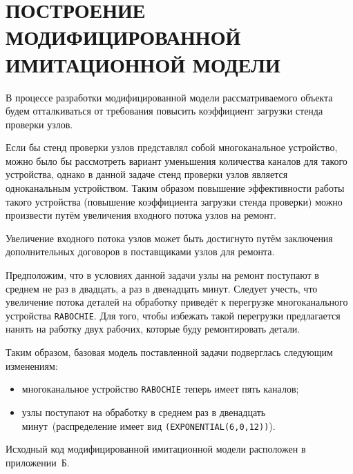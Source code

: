 \section[Построение модифицированной имитационной модели]
{ПОСТРОЕНИЕ МОДИФИЦИРОВАННОЙ \\ ИМИТАЦИОННОЙ МОДЕЛИ}

В процессе разработки модифицированной модели рассматриваемого объекта
будем отталкиваться от требования повысить коэффициент загрузки стенда
проверки узлов.

Если бы стенд проверки узлов представлял собой многоканальное
устройство, можно было бы рассмотреть вариант уменьшения количества каналов
для такого устройства, однако в данной задаче стенд проверки узлов является
одноканальным устройством. Таким образом повышение эффективности работы
такого устройства (повышение коэффициента загрузки стенда проверки) можно
произвести путём увеличения входного потока узлов на ремонт.

Увеличение входного потока узлов может быть достигнуто путём заключения
дополнительных договоров в поставщиками узлов для ремонта.

Предположим, что в условиях данной задачи узлы на ремонт поступают в среднем
не раз в двадцать, а раз в двенадцать минут. Следует учесть, что увеличение
потока деталей на обработку приведёт к перегрузке многоканального устройства
\texttt{RABOCHIE}. Для того, чтобы избежать такой перегрузки предлагается
нанять на работку двух рабочих, которые буду ремонтировать детали.

Таким образом, базовая модель поставленной задачи подверглась следующим изменениям:
\begin{itemize}
  \item многоканальное устройство \texttt{RABOСHIE} теперь имеет пять каналов;
  \item узлы поступают на обработку в среднем раз в двенадцать минут~(распределение
    имеет вид \texttt{(EXPONENTIAL(6,0,12))}).
\end{itemize}

Исходный код модифицированной имитационной модели расположен в приложении~Б.

\pagebreak
